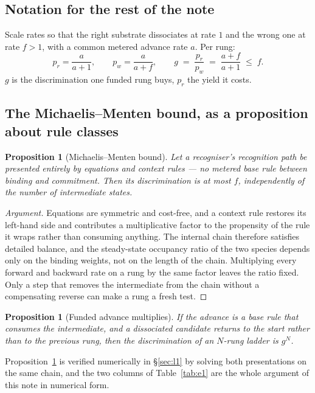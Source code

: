 \documentclass[11pt]{article}
\theoremstyle{plain}
\newtheorem{proposition}[theorem]{Proposition}
\theoremstyle{definition}
\theoremstyle{remark}
\begin{document}
\subsection{Notation for the rest of the note}

Scale rates so that the right substrate dissociates at rate $1$ and the wrong
one at rate $f > 1$, with a common metered advance rate $a$. Per rung:
\[
p_r = \frac{a}{a+1}, \qquad
p_w = \frac{a}{a+f}, \qquad
g \;=\; \frac{p_r}{p_w} \;=\; \frac{a+f}{a+1} \;\leq\; f .
\]
$g$ is the discrimination one funded rung buys, $p_r$ the yield it costs.

\subsection{The Michaelis--Menten bound, as a proposition about rule classes}

\begin{proposition}[Michaelis--Menten bound]
\label{prop:mmbound}
Let a recogniser's recognition path be presented entirely by equations and
context rules --- no metered base rule between binding and commitment. Then
its discrimination is at most $f$, independently of the number of intermediate
states.
\end{proposition}

\begin{proof}[Argument]
Equations are symmetric and cost-free, and a context rule restores its
left-hand side and contributes a multiplicative factor to the propensity of
the rule it wraps rather than consuming anything. The internal chain therefore
satisfies detailed balance, and the steady-state occupancy ratio of the two
species depends only on the binding weights, not on the length of the chain.
Multiplying every forward and backward rate on a rung by the same factor
leaves the ratio fixed. Only a step that removes the intermediate from the
chain without a compensating reverse can make a rung a fresh test.
\end{proof}

\begin{proposition}[Funded advance multiplies]
\label{prop:multiplies}
If the advance is a base rule that consumes the intermediate, and a dissociated
candidate returns to the start rather than to the previous rung, then the
discrimination of an $N$-rung ladder is $g^{N}$.
\end{proposition}

Proposition~\ref{prop:mmbound} is verified numerically in \S\ref{sec:l1} by
solving both presentations on the same chain, and the two columns of
Table~\ref{tab:e1} are the whole argument of this note in numerical form.
\end{document}
